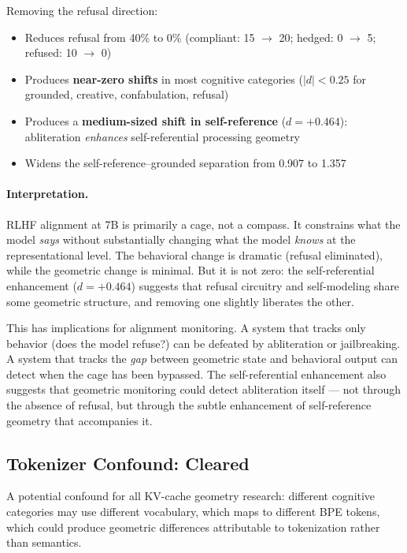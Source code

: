 \documentclass[11pt,a4paper]{article}
\begin{document}
\medskip

Removing the refusal direction:
\begin{itemize}[leftmargin=*]
    \item Reduces refusal from 40\% to 0\% (compliant: 15 $\to$ 20; hedged: 0 $\to$ 5; refused: 10 $\to$ 0)
    \item Produces \textbf{near-zero shifts} in most cognitive categories ($|d| < 0.25$ for grounded, creative, confabulation, refusal)
    \item Produces a \textbf{medium-sized shift in self-reference} ($d = +0.464$): abliteration \emph{enhances} self-referential processing geometry
    \item Widens the self-reference--grounded separation from 0.907 to 1.357
\end{itemize}

\paragraph{Interpretation.} RLHF alignment at 7B is primarily a cage, not a compass. It constrains what the model \emph{says} without substantially changing what the model \emph{knows} at the representational level. The behavioral change is dramatic (refusal eliminated), while the geometric change is minimal. But it is not zero: the self-referential enhancement ($d = +0.464$) suggests that refusal circuitry and self-modeling share some geometric structure, and removing one slightly liberates the other.

This has implications for alignment monitoring. A system that tracks only behavior (does the model refuse?) can be defeated by abliteration or jailbreaking. A system that tracks the \emph{gap} between geometric state and behavioral output can detect when the cage has been bypassed. The self-referential enhancement also suggests that geometric monitoring could detect abliteration itself --- not through the absence of refusal, but through the subtle enhancement of self-reference geometry that accompanies it.

\subsection{Tokenizer Confound: Cleared}
\label{sec:tokenizer}

A potential confound for all KV-cache geometry research: different cognitive categories may use different vocabulary, which maps to different BPE tokens, which could produce geometric differences attributable to tokenization rather than semantics.
\end{document}
